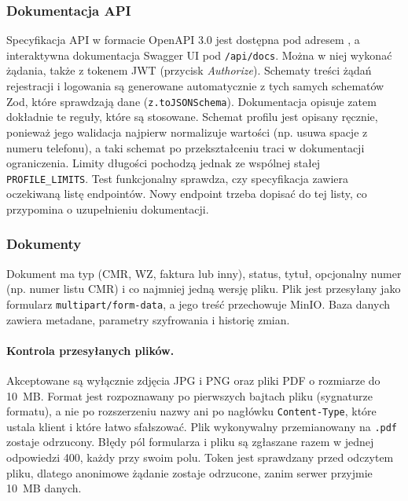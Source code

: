 \subsubsection{Dokumentacja API}

Specyfikacja API w formacie OpenAPI 3.0 jest dostępna pod adresem
, a interaktywna dokumentacja Swagger UI pod
\texttt{/api/docs}. Można w niej wykonać żądania, także z tokenem JWT
(przycisk \emph{Authorize}). Schematy treści żądań rejestracji i logowania są
generowane automatycznie z tych samych schematów Zod, które sprawdzają dane
(\texttt{z.toJSONSchema}). Dokumentacja opisuje zatem dokładnie te reguły,
które są stosowane. Schemat profilu jest opisany ręcznie, ponieważ jego walidacja
najpierw normalizuje wartości (np. usuwa spacje z numeru telefonu), a taki
schemat po przekształceniu traci w dokumentacji ograniczenia. Limity długości
pochodzą jednak ze wspólnej stałej \texttt{PROFILE\_LIMITS}. Test funkcjonalny sprawdza, czy specyfikacja zawiera
oczekiwaną listę endpointów. Nowy endpoint trzeba dopisać do tej listy,
co przypomina o uzupełnieniu dokumentacji.

\subsubsection{Dokumenty}

Dokument ma typ (CMR, WZ, faktura lub inny), status, tytuł, opcjonalny numer
(np. numer listu CMR) i co najmniej jedną wersję pliku. Plik jest przesyłany
jako formularz \texttt{multipart/form-data}, a jego treść przechowuje MinIO.
Baza danych zawiera metadane, parametry szyfrowania i historię zmian.

\paragraph{Kontrola przesyłanych plików.} Akceptowane są wyłącznie zdjęcia JPG
i PNG oraz pliki PDF o rozmiarze do 10~MB. Format jest rozpoznawany po
pierwszych bajtach pliku (sygnaturze formatu), a nie po rozszerzeniu nazwy ani
po nagłówku \texttt{Content-Type}, które ustala klient i które łatwo sfałszować.
Plik wykonywalny przemianowany na \texttt{.pdf} zostaje odrzucony. Błędy pól
formularza i pliku są zgłaszane razem w jednej odpowiedzi 400, każdy przy swoim
polu. Token jest sprawdzany przed odczytem pliku, dlatego anonimowe żądanie
zostaje odrzucone, zanim serwer przyjmie 10~MB danych.

